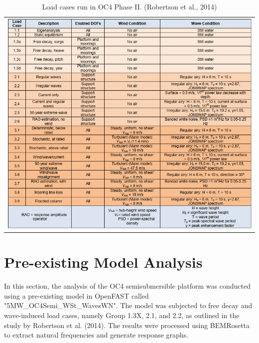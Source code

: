 \documentclass[a4paper, 11pt]{article}
\begin{document}
\begin{table}[H]
    \centering
    \caption{Load cases run in OC4 Phase II. (Robertson et al., 2014)}
    \label{tab:image_table}
    \begin{tabular}{c}
        \includegraphics[width=1\textwidth]{table_3.png} \\
    \end{tabular}
\end{table}


\section{Pre-existing Model Analysis}

\hspace*{0.5cm}In this section, the analysis of the OC4 semisubmersible platform was conducted using a pre-existing model in OpenFAST called "5MW\_OC4Semi\_WSt\_WavesWN". The model was subjected to free decay and wave-induced load cases, namely Group 1.3X, 2.1, and 2.2, as outlined in the study by Robertson et al. (2014). The results were processed using BEMRosetta to extract natural frequencies and generate response graphs.
\end{document}
